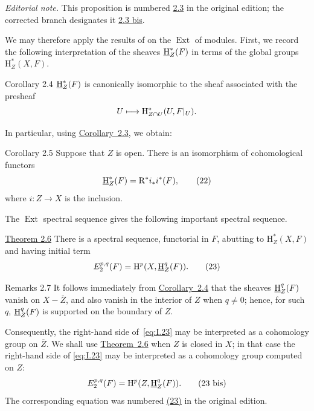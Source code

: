 \noindent\textit{Editorial note.} This proposition is numbered \hyperref[I.2.3bof]{2.3} in the
original edition; the corrected branch designates it \hyperref[I.2.3bis]{2.3 bis}.

We may therefore apply the results of \cite{Tohoku} on the $\operatorname{Ext}$
of modules. First, we record the following interpretation of the sheaves
$\mathop{\underline{\mathrm H}}\nolimits_Z^*(F)$ in terms of the global groups $\mathrm H_Z^*(X,F)$.

\begin{sgastatement}{Corollary 2.4}
$\mathop{\underline{\mathrm H}}\nolimits_Z^*(F)$ is canonically isomorphic to the sheaf associated with the
presheaf
\[
  U\longmapsto
  \mathrm H_{Z\cap U}^*(U,F\vert_{U}).
\]
\end{sgastatement}

In particular, using \hyperref[I.2.3bof]{Corollary~2.3}, we obtain:

\begin{sgastatement}{Corollary 2.5}
Suppose that $Z$ is open. There is an isomorphism of cohomological functors
\begin{equation}
  \mathop{\underline{\mathrm H}}\nolimits_Z^*(F)=\mathrm R^*i_*i^*(F),
  \tag{22}\label{eq:I.22}
\end{equation}
where $i\colon Z\to X$ is the inclusion.
\end{sgastatement}

The $\operatorname{Ext}$ spectral sequence gives the following important
spectral sequence.

\begin{sgastatement}{\hyperref[I.2.6]{Theorem 2.6}}
There is a spectral sequence, functorial in $F$, abutting to
$\mathrm H_Z^*(X,F)$ and having initial term
\begin{equation}
  E_2^{p,q}(F)=\mathrm H^p(X,\mathop{\underline{\mathrm H}}\nolimits_Z^q(F)).
  \tag{23}\label{eq:I.23}
\end{equation}
\end{sgastatement}

\begin{sgaremark}{Remarks 2.7}
It follows immediately from \hyperref[I.2.4]{Corollary~2.4} that the sheaves $\mathop{\underline{\mathrm H}}\nolimits_Z^q(F)$
vanish on $X-\overline Z$, and also vanish in the interior of $Z$ when
$q\ne0$; hence, for such $q$, $\mathop{\underline{\mathrm H}}\nolimits_Z^q(F)$ is supported on the boundary of
$Z$.

Consequently, the right-hand side of~\eqref{eq:I.23} may be interpreted as a
cohomology group on $\overline Z$. We shall use \hyperref[I.2.6]{Theorem~2.6} when $Z$ is
closed in $X$; in that case the right-hand side of
\eqref{eq:I.23} may be interpreted as a cohomology group computed on $Z$:
\begin{equation}
  E_2^{p,q}(F)=\mathrm H^p(Z,\mathop{\underline{\mathrm H}}\nolimits_Z^q(F)).
  \tag{23 bis}\label{eq:I.23bis}
\end{equation}
The corresponding equation was numbered \hyperref[eq:I.23]{(23)} in the original edition.
\end{sgaremark}

